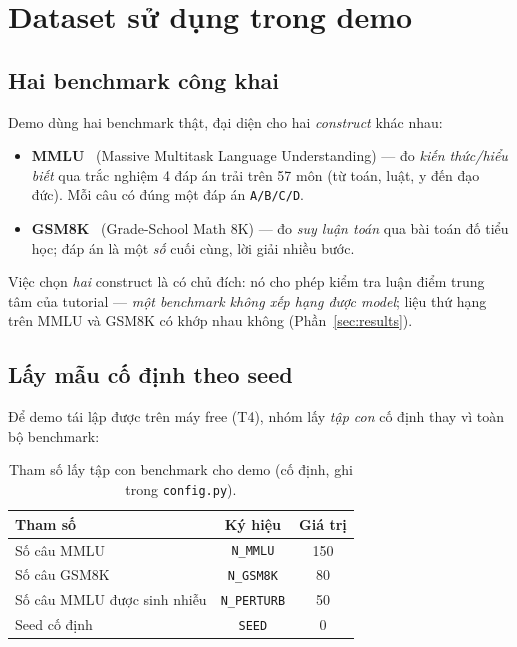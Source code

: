 \section{Dataset sử dụng trong demo}
\label{sec:dataset}

\subsection{Hai benchmark công khai}

Demo dùng hai benchmark thật, đại diện cho hai \emph{construct} khác nhau:

\begin{itemize}
  \item \textbf{MMLU}~\cite{hendrycks2021mmlu} (Massive Multitask Language
    Understanding) --- đo \emph{kiến thức/hiểu biết} qua trắc nghiệm 4 đáp án trải
    trên 57 môn (từ toán, luật, y đến đạo đức). Mỗi câu có đúng một đáp án
    \texttt{A/B/C/D}.
  \item \textbf{GSM8K}~\cite{cobbe2021gsm8k} (Grade-School Math 8K) --- đo
    \emph{suy luận toán} qua bài toán đố tiểu học; đáp án là một \emph{số} cuối
    cùng, lời giải nhiều bước.
\end{itemize}

Việc chọn \emph{hai} construct là có chủ đích: nó cho phép kiểm tra luận điểm
trung tâm của tutorial --- \emph{một benchmark không xếp hạng được model};
liệu thứ hạng trên MMLU và GSM8K có khớp nhau không (Phần~\ref{sec:results}).

\subsection{Lấy mẫu cố định theo seed}

Để demo tái lập được trên máy free (T4), nhóm lấy \emph{tập con} cố định
thay vì toàn bộ benchmark:

\begin{table}[t]
\centering
\caption{Tham số lấy tập con benchmark cho demo (cố định, ghi trong
\texttt{config.py}).}
\label{tab:subset}
\small
\begin{tabular}{lcc}
\hline
\textbf{Tham số} & \textbf{Ký hiệu} & \textbf{Giá trị} \\
\hline
Số câu MMLU & \texttt{N\_MMLU} & 150 \\
Số câu GSM8K & \texttt{N\_GSM8K} & 80 \\
Số câu MMLU được sinh nhiễu & \texttt{N\_PERTURB} & 50 \\
Seed cố định & \texttt{SEED} & 0 \\
\hline
\end{tabular}
\end{table}

